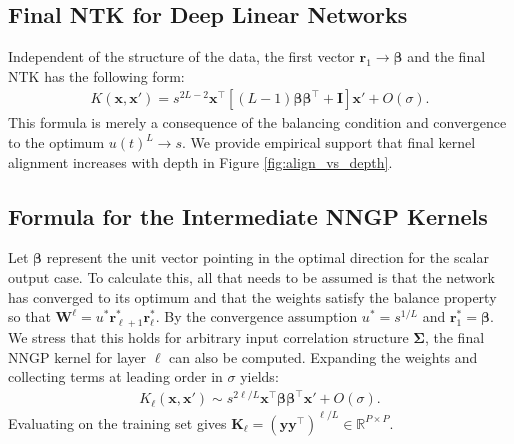 \documentclass{article} %
\def\x{\bm x}
\begin{document}
\begin{appendix}

\subsection{Final NTK for Deep Linear Networks}\label{app:NTK_final_deep_linear}
Independent of the structure of the data, the first vector $\bm r_1 \to \bm\beta$ and the final NTK has the following form:
\begin{align}
    K(\x,\x') = s^{2L-2} \x^\top \left[ (L-1) \bm\beta \bm\beta^\top +  \bm I \right] \x' + O(\sigma).
\end{align}
This formula is merely a consequence of the balancing condition and convergence to the optimum $u(t)^L \to s$. We provide empirical support that final kernel alignment increases with depth in Figure \ref{fig:align_vs_depth}.

\subsection{Formula for the Intermediate NNGP Kernels}

Let $\bm\beta$ represent the unit vector pointing in the optimal direction for the scalar output case. To calculate this, all that needs to be assumed is that the network has converged to its optimum and that the weights satisfy the balance property so that $\bm W^{\ell} = u^* \bm r_{\ell+1}^* \bm r_{\ell}^*$. By the convergence assumption $u^* = s^{1/L}$ and $\bm r_1^* = \bm\beta$. We stress that this holds for arbitrary input correlation structure $\bm\Sigma$, the final NNGP kernel for layer $\ell$ can also be computed. Expanding the weights and collecting terms at leading order in $\sigma$ yields:
\begin{align}
    K_{\ell}(\x,\x') \sim s^{2\ell / L}  \x^\top \bm \beta \bm\beta^\top \x'  + O(\sigma).
\end{align}
Evaluating on the training set gives $\bm K_{\ell} = \left( \bm y \bm y^\top  \right)^{\ell/L} \in \mathbb{R}^{P \times P}$.


\end{appendix}
\end{document}
